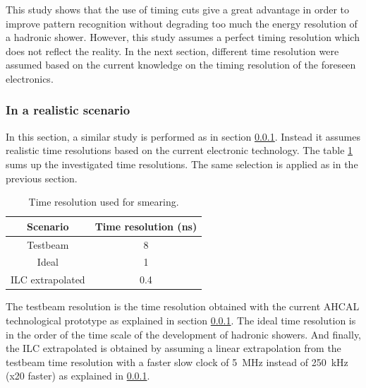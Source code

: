 This study shows that the use of timing cuts give a great advantage in order to improve pattern recognition without degrading too much the energy resolution of a hadronic shower. However, this study assumes a perfect timing resolution which does not reflect the reality. In the next section, different time resolution were assumed based on the current knowledge on the timing resolution of the foreseen electronics.

\subsubsection{In a realistic scenario}

In this section, a similar study is performed as in section \ref{}. Instead it assumes realistic time resolutions based on the current electronic technology. The table \ref{table:TimeReso} sums up the investigated time resolutions. The same selection is applied as in the previous section.

\begin{table}[htb!]
  \centering
  \caption{Time resolution used for smearing.} \label{table:TimeReso}
  \begin{tabular}{|c|c|}
    \hline
    Scenario & Time resolution (ns) \\
    \hline
    Testbeam & 8 \\
    Ideal & 1 \\
    ILC extrapolated & 0.4 \\
    \hline
  \end{tabular}
\end{table}

The testbeam resolution is the time resolution obtained with the current AHCAL technological prototype as explained in section \ref{}. The ideal time resolution is in the order of the time scale of the development of hadronic showers. And finally, the ILC extrapolated is obtained by assuming a linear extrapolation from the testbeam time resolution with a faster slow clock of \SI{5}{\mega\hertz} instead of \SI{250}{\kilo\hertz} (x20 faster) as explained in \ref{}.\\

